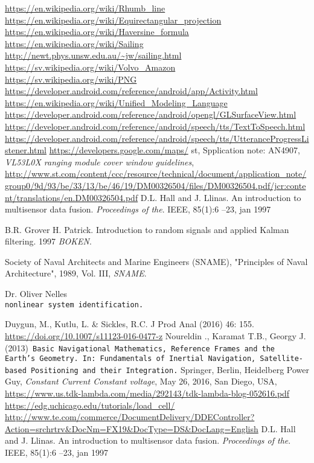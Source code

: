 \begin{thebibliography}{9}
  \url{https://en.wikipedia.org/wiki/Rhumb_line}
  \url{https://en.wikipedia.org/wiki/Equirectangular_projection}
  \url{https://en.wikipedia.org/wiki/Haversine_formula}
  \url{https://en.wikipedia.org/wiki/Sailing}
  \url{http://newt.phys.unsw.edu.au/~jw/sailing.html}
  \url{https://sv.wikipedia.org/wiki/Volvo_Amazon}
  \url{https://sv.wikipedia.org/wiki/PNG}
  \url{https://developer.android.com/reference/android/app/Activity.html}
  \url{https://en.wikipedia.org/wiki/Unified_Modeling_Language}
  \url{https://developer.android.com/reference/android/opengl/GLSurfaceView.html}
  \url{https://developer.android.com/reference/android/speech/tts/TextToSpeech.html}
  \url{https://developer.android.com/reference/android/speech/tts/UtteranceProgressListener.html}
  \url{https://developers.google.com/maps/}
	\gls{st}, Spplication note: AN4907, \emph{VL53L0X ranging module cover window guidelines},
	\url{http://www.st.com/content/ccc/resource/technical/document/application_note/group0/9d/93/be/33/13/be/46/19/DM00326504/files/DM00326504.pdf/jcr:content/translations/en.DM00326504.pdf}
D.L. Hall and J. Llinas. An introduction to multisensor data fusion. 
\textit{Proceedings of the}. IEEE, 85(1):6 –23, jan 1997

B.R. Grover H. Patrick. Introduction to random signals and applied Kalman filtering. 1997
\textit{BOKEN}. 

Society of Naval Architects and Marine Engineers (SNAME), "Principles of Naval Architecture", 1989, Vol. III,
\textit{SNAME}. 

 
Dr. Oliver Nelles
\\\texttt{nonlinear system identification.}

Duygun, M., Kutlu, L. \& Sickles, R.C. J Prod Anal (2016) 46: 155. \url{https://doi.org/10.1007/s11123-016-0477-z}
Noureldin ., Karamat T.B., Georgy J. (2013)\texttt{ Basic Navigational Mathematics, Reference Frames and the Earth’s Geometry. In: Fundamentals of Inertial Navigation, Satellite-based Positioning and their Integration.} Springer, Berlin, Heidelberg
	Power Guy, \emph{Constant Current Constant voltage}, May 26, 2016, San Diego, USA,
  \url{https://www.us.tdk-lambda.com/media/292143/tdk-lambda-blog-052616.pdf}
	\url{https://edg.uchicago.edu/tutorials/load_cell/}
	\url{http://www.te.com/commerce/DocumentDelivery/DDEController?Action=srchrtrv&DocNm=FX19&DocType=DS&DocLang=English}
D.L. Hall and J. Llinas. An introduction to multisensor data fusion. 
\textit{Proceedings of
the}. IEEE, 85(1):6 –23, jan 1997


\end{thebibliography}
